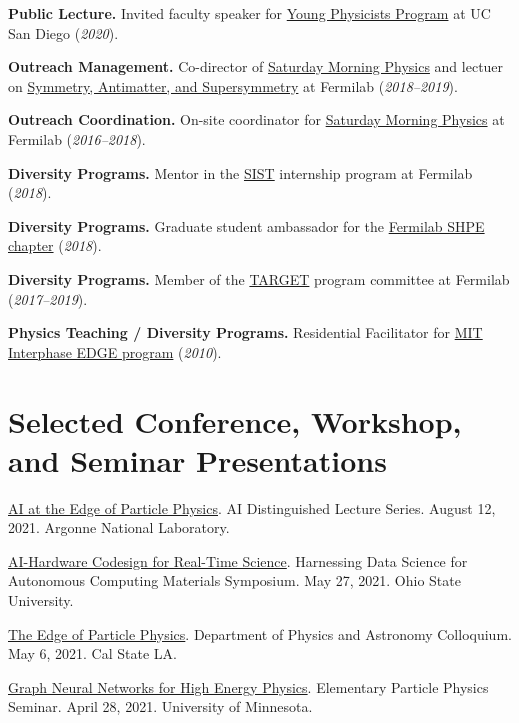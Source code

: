 \documentclass[11pt]{res}
\newcommand{\MarginText}[1]{\section{#1}\vspace{10pt}}
\begin{document}
\begin{resume}
\textbf{Public Lecture.} Invited faculty speaker for \href{http://ypp.ucsd.edu/}{Young Physicists Program} at UC San Diego (\textit{2020}).

\textbf{Outreach Management.} Co-director of \href{http://saturdaymorningphysics.fnal.gov/}{Saturday
  Morning Physics} and lectuer on \href{http://saturdaymorningphysics.fnal.gov/fall-session-2018/}{Symmetry, Antimatter, and Supersymmetry} at Fermilab (\textit{2018--2019}).

\textbf{Outreach Coordination.} On-site coordinator for \href{http://saturdaymorningphysics.fnal.gov/}{Saturday Morning Physics} at Fermilab (\textit{2016--2018}).

\textbf{Diversity Programs.} Mentor in the \href{http://diversity.fnal.gov/sist/}{SIST} internship program at Fermilab (\textit{2018}).

\textbf{Diversity Programs.} Graduate student ambassador for the \href{http://diversity.fnal.gov/fshpe/}{Fermilab SHPE chapter} (\textit{2018}).

\textbf{Diversity Programs.} Member of the \href{http://diversity.fnal.gov/target/}{TARGET} program committee at Fermilab (\textit{2017--2019}).

\textbf{Physics Teaching / Diversity Programs.} Residential Facilitator for \href{http://ome.mit.edu/programs-services/program-overview}{MIT Interphase EDGE program} (\textit{2010}).


\MarginText{Selected Conference, Workshop, and Seminar Presentations}

\href{https://www.anl.gov/event/ai-at-the-edge-of-particle-physics}{AI at the Edge of Particle Physics}. AI Distinguished Lecture Series. August 12, 2021. Argonne National Laboratory.

\href{https://tdai.osu.edu/events/acm-symposium-harnessing-data-science-autonomous-computing-materials}{AI-Hardware Codesign for Real-Time Science}. Harnessing Data Science for Autonomous Computing Materials Symposium. May 27, 2021. Ohio State University.

\href{https://www.calstatela.edu/dept/physics/colloquia-and-events}{The Edge of Particle Physics}. Department of Physics and Astronomy Colloquium. May 6, 2021. Cal State LA.

\href{https://cse.umn.edu/physics/elementary-particle-physics-elem-part-phys-seminar}{Graph Neural Networks for High Energy Physics}. Elementary Particle Physics Seminar. April 28, 2021. University of Minnesota.


\end{resume}
\end{document}

